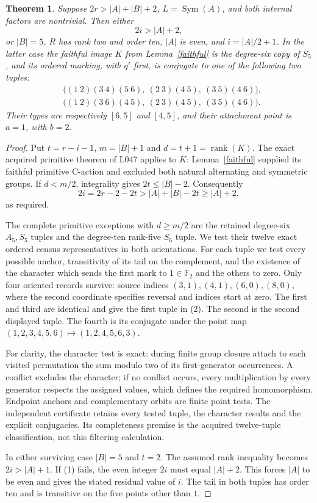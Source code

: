 \documentclass[11pt,a4paper]{article}
\newtheorem{theorem}{Theorem}
\newcommand{\Sym}{\operatorname{Sym}}
\begin{document}
\begin{theorem}\label{descent}
Suppose $2r>|A|+|B|+2$, $L=\Sym(A)$, and both internal
factors are nontrivial. Then either
\[
                         2i>|A|+2,                    \tag{1}
\]
or $|B|=5$, $R$ has rank two and order ten, $|A|$ is even,
and $i=|A|/2+1$. In the latter case the faithful image $K$
from Lemma~\ref{faithful} is the degree-six copy of $S_5$,
and its ordered marking, with $q'$ first, is conjugate to one
of the following two tuples:
\[
\begin{split}
 &\bigl((1\ 2)(3\ 4)(5\ 6),\ (2\ 3)(4\ 5),\ (3\ 5)(4\ 6)\bigr),\\
 &\bigl((1\ 2)(3\ 6)(4\ 5),\ (2\ 3)(4\ 5),\ (3\ 5)(4\ 6)\bigr).
\end{split}                                             \tag{2}
\]
Their types are respectively $[6,5]$ and $[4,5]$, and their
attachment point is $a=1$, with $b=2$.
\end{theorem}
\begin{proof}
Put $t=r-i-1$, $m=|B|+1$ and $d=t+1=\operatorname{rank}(K)$.
The exact acquired primitive theorem of L047 applies to $K$:
Lemma~\ref{faithful} supplied its faithful primitive C-action
and excluded both natural alternating and symmetric groups.
If $d<m/2$, integrality gives $2t\le|B|-2$. Consequently
\[
 2i=2r-2-2t>|A|+|B|-2t\ge |A|+2,
\]
as required.

The complete primitive exceptions with $d\ge m/2$ are the
retained degree-six $A_5,S_5$ tuples and the degree-ten rank-five
$S_6$ tuple. We test their twelve exact ordered census
representatives in both orientations. For each tuple we test
every possible anchor, transitivity of its tail on the
complement, and the existence of the character which sends
the first mark to $1\in\mathbb F_2$ and the others to zero.
Only four oriented records survive: source indices
$(3,1),(4,1),(6,0),(8,0)$, where the second coordinate specifies
reversal and indices start at zero. The first and third are
identical and give the first tuple in (2). The second is the
second displayed tuple. The fourth is its conjugate under
the point map $(1,2,3,4,5,6)\mapsto(1,2,4,5,6,3)$.

For clarity, the character test is exact: during finite group
closure attach to each visited permutation the sum modulo two
of its first-generator occurrences. A conflict excludes the
character; if no conflict occurs, every multiplication by
every generator respects the assigned values, which defines
the required homomorphism. Endpoint anchors and complementary
orbits are finite point tests. The independent certificate
retains every tested tuple, the character results and the
explicit conjugacies. Its completeness premise is the acquired
twelve-tuple classification, not this filtering calculation.

In either surviving case $|B|=5$ and $t=2$. The assumed rank
inequality becomes $2i>|A|+1$. If (1) fails, the even integer
$2i$ must equal $|A|+2$. This forces $|A|$ to be even and gives
the stated residual value of $i$. The tail in both tuples has
order ten and is transitive on the five points other than $1$.
\end{proof}
\end{document}
